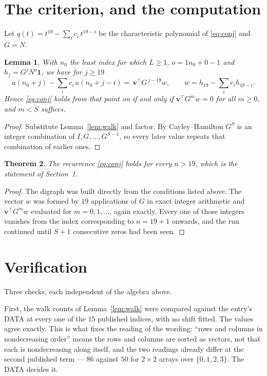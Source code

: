 \documentclass[11pt,a4paper]{article}
\theoremstyle{plain}
\newtheorem{theorem}{Theorem}
\newtheorem{lemma}[theorem]{Lemma}
\theoremstyle{definition}
\begin{document}
\section{The criterion, and the computation}

Let $q(t)=t^{19}-\sum_i c_i\,t^{19-i}$ be the characteristic polynomial of
\eqref{eq:conj} and $G=N$.

\begin{lemma}\label{lem:crit}
With $n_0$ the least index for which $L\ge1$, $o=1n_0+0-1$ and
$h_j=G^{j}N^{o}\mathbf{1}$, we have for $j\ge19$
\[
a(n_0+j)-\sum_i c_i\,a(n_0+j-i)=\,\mathbf{v}^{\!\top}G^{\,j-19}w,
\qquad w=h_{19}-\sum_i c_ih_{19-i} .
\]
Hence \eqref{eq:conj} holds from that point on if and only if
$\mathbf{v}^{\!\top}G^{m}w=0$ for all $m\ge0$, and $m<S$ suffices.
\end{lemma}

\begin{proof}
Substitute Lemma~\ref{lem:walk} and factor. By Cayley--Hamilton $G^{S}$ is an integer
combination of $I,G,\dots,G^{S-1}$, so every later value repeats that combination of
earlier ones.
\end{proof}

\begin{theorem}
The recurrence \eqref{eq:conj} holds for every $n>19$, which is the statement of
Section~1.
\end{theorem}

\begin{proof}
The digraph was built directly from the conditions listed above. The vector $w$ was formed by
$19$ applications of $G$ in exact integer arithmetic and $\mathbf{v}^{\!\top}G^{m}w$
evaluated for $m=0,1,\dots$, again exactly. Every one of those integers vanishes from the
index corresponding to $n=19+1$ onwards, and the run continued until $S+1$ consecutive
zeros had been seen.
\end{proof}

\section{Verification}

Three checks, each independent of the algebra above.

First, the walk counts of Lemma~\ref{lem:walk} were compared against the entry's DATA at
every one of the $15$ published indices, with no shift fitted. The values agree exactly.
This is what fixes the reading of the wording: ``rows and columns in nondecreasing order''
means the rows and columns are sorted as vectors, not that each is nondecreasing along
itself, and the two readings already differ at the second published term --- $86$ against
$50$ for $2\times2$ arrays over $\{0,1,2,3\}$. The DATA decides it.
\end{document}
